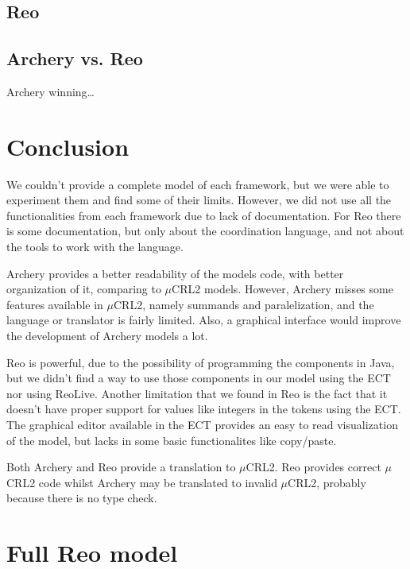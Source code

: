 \documentclass[a4paper]{article}
\newcommand{\ar}{Archery\xspace}
\newcommand{\re}{Reo\xspace}
\newcommand{\mcrl}{$\mu$CRL2\xspace}
\begin{document}
\subsection{\re}


\subsection{\ar vs. \re}

\ar winning\dots

%
%
\section{Conclusion}
We couldn't provide a complete model of each framework, but we were able to
experiment them and find some of their limits. However, we did not use all the
functionalities from each framework due to lack of documentation. For \re there
is some documentation, but only about the coordination language, and not about
the tools to work with the language.

\ar provides a better readability of the models code, with better organization
of it, comparing to \mcrl models. However, \ar misses some features available
in \mcrl, namely summands and paralelization, and the language or translator is
fairly limited. Also, a graphical interface would improve the development of
\ar models a lot.


\re is powerful, due to the possibility of programming the components in Java,
but we didn't find a way to use those components in our model using the ECT nor
using ReoLive. Another limitation that we found in \re is the fact that it
doesn't have proper support for values like integers in the tokens using the
ECT. The graphical editor available in the ECT provides an easy to read
visualization of the model, but lacks in some basic functionalites like
copy/paste.

Both \ar and \re provide a translation to \mcrl. \re provides correct \mcrl
code whilst \ar may be translated to invalid \mcrl, probably because there is
no type check.



\appendix
\section{Full \re model}\label{app:reo}
\end{document}
